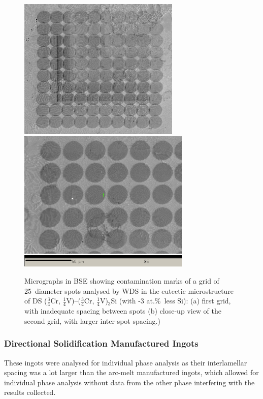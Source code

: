 \begin{figure}[H]
\begin{center}
\includegraphics[width=7.7cm]{_Sep6_75CrafterSE}
\includegraphics[width=8.2cm]{Sep675Cr_eut_minus3Si_gridii_scaleafterBSE}
\caption{Micrographs in BSE showing contamination marks of a grid of 25\micro\metre\ diameter spots analysed by WDS in the eutectic microstructure of DS ($\frac{3}{4}$Cr, $\frac{1}{4}$V)--($\frac{3}{4}$Cr, $\frac{1}{4}$V)$_3$Si (with -3 at.\%\ less Si): (a) first grid, with inadequate spacing between spots (b) close-up view of the second grid, with larger inter-spot spacing.)}
\label{fig:75CrgridiiiSEafter}
\end{center}
\end{figure}


 
%
\subsubsection{Directional Solidification Manufactured Ingots}
These ingots were analysed for individual phase analysis as their interlamellar spacing was a lot larger than the arc-melt manufactured ingots, which allowed for individual phase analysis without data from the other phase interfering with the results collected.

